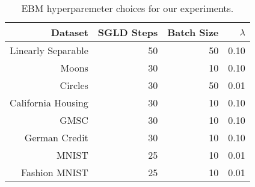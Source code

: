 \begin{table}

\caption{EBM hyperparemeter choices for our experiments. \label{tab:ebmparams} \newline}
\centering
\fontsize{8}{10}\selectfont
\begin{tabular}[t]{rrrr}
\toprule
Dataset & SGLD Steps & Batch Size & $\lambda$\\
\midrule
Linearly Separable & 50 & 50 & 0.10\\
Moons & 30 & 10 & 0.10\\
Circles & 30 & 50 & 0.01\\
California Housing & 30 & 10 & 0.10\\
GMSC & 30 & 10 & 0.10\\
German Credit & 30 & 10 & 0.10\\
MNIST & 25 & 10 & 0.01\\
Fashion MNIST & 25 & 10 & 0.01\\
\bottomrule
\end{tabular}
\end{table}
